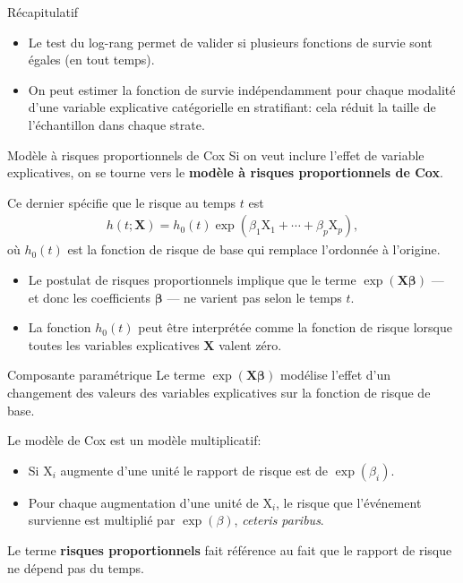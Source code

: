 \documentclass[
  ignorenonframetext,
]{beamer}
\providecommand{\tightlist}{%
  \setlength{\itemsep}{0pt}\setlength{\parskip}{0pt}}\usepackage{longtable,booktabs,array}
\begin{document}
\begin{frame}{Récapitulatif}
\protect\hypertarget{ruxe9capitulatif-4}{}
\begin{itemize}
\tightlist
\item
  Le test du log-rang permet de valider si plusieurs fonctions de survie
  sont égales (en tout temps).
\item
  On peut estimer la fonction de survie indépendamment pour chaque
  modalité d'une variable explicative catégorielle en stratifiant: cela
  réduit la taille de l'échantillon dans chaque strate.
\end{itemize}
\end{frame}

\begin{frame}{Modèle à risques proportionnels de Cox}
\protect\hypertarget{moduxe8le-uxe0-risques-proportionnels-de-cox}{}
Si on veut inclure l'effet de variable explicatives, on se tourne vers
le \textbf{modèle à risques proportionnels de Cox}.

Ce dernier spécifie que le risque au temps \(t\) est \begin{align*}
h(t; \mathbf{X}) = h_0(t)\exp(\beta_1\mathrm{X}_1 + \cdots + \beta_p \mathrm{X}_p),
\end{align*} où \(h_0(t)\) est la fonction de risque de base qui
remplace l'ordonnée à l'origine.

\begin{itemize}
\tightlist
\item
  Le postulat de risques proportionnels implique que le terme
  \(\exp(\mathbf{X}\boldsymbol{\beta})\) --- et donc les coefficients
  \(\boldsymbol{\beta}\) --- ne varient pas selon le temps \(t\).
\item
  La fonction \(h_0(t)\) peut être interprétée comme la fonction de
  risque lorsque toutes les variables explicatives \(\mathbf{X}\) valent
  zéro.
\end{itemize}
\end{frame}

\begin{frame}{Composante paramétrique}
\protect\hypertarget{composante-paramuxe9trique}{}
Le terme \(\exp(\mathbf{X}\boldsymbol{\beta})\) modélise l'effet d'un
changement des valeurs des variables explicatives sur la fonction de
risque de base.

Le modèle de Cox est un modèle multiplicatif:

\begin{itemize}
\tightlist
\item
  Si \(\mathrm{X}_i\) augmente d'une unité le rapport de risque est de
  \(\exp(\beta_i)\).
\item
  Pour chaque augmentation d'une unité de \(\mathrm{X}_i\), le risque
  que l'événement survienne est multiplié par \(\exp(\beta)\),
  \emph{ceteris paribus}.
\end{itemize}

Le terme \textbf{risques proportionnels} fait référence au fait que le
rapport de risque ne dépend pas du temps.
\end{frame}
\end{document}
